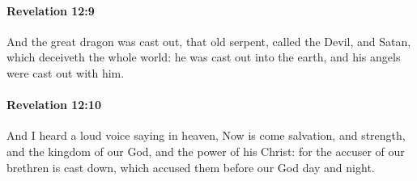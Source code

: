 		\paragraph{Revelation 12:9} %
			\label{REVELATIONNT-12-9}

			And the great dragon was cast out, that old serpent, called the Devil, and Satan, which deceiveth the whole world: he was cast out into the earth, and his angels were cast out with him.

			\begin{framed}
			\scriptsize
				\begin{compactdesc}
					\item[SBLG] 
				\end{compactdesc}
			\end{framed}

		\paragraph{Revelation 12:10} %
			\label{REVELATIONNT-12-10}

			And I heard a loud voice saying in heaven, Now is come salvation, and strength, and the kingdom of our God, and the power of his Christ: for the accuser of our brethren is cast down, which accused them before our God day and night.

